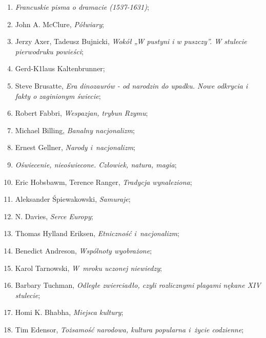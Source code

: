 \documentclass[a4paper,11pt]{article}
\begin{document}
\begin{enumerate}
\item \textit{Francuskie pisma o dramacie (1537-1631)};

\item John A. McClure, \textit{Półwiary};

\item Jerzy Axer, Tadeusz Bujnicki, \textit{Wokół „W pustyni i w
    puszczy”. W stulecie pierwodruku powieści};

\item Gerd-K1laus Kaltenbrunner;

\item Steve Brusatte, \textit{Era dinozaurów - od narodzin do upadku.
    Nowe odkrycia i fakty o zaginionym świecie};

\item Robert Fabbri, \textit{Wespazjan, trybun Rzymu};

\item Michael Billing, \textit{Banalny nacjonalizm};

\item Ernest Gellner, \textit{Narody i~nacjonalizm};

\item \textit{Oświecenie, nieoświecone. Człowiek, natura, magia};

\item Eric Hobsbawm, Terence Ranger, \textit{Tradycja wynaleziona};

\item Aleksander Śpiewakowski, \textit{Samuraje};

\item N. Davies, \textit{Serce Europy};

\item Thomas Hylland Eriksen, \textit{Etniczność i~nacjonalizm};

\item Benedict Andreson, \textit{Wspólnoty wyobrażone};

\item Karol Tarnowski, \textit{W~mroku uczonej niewiedzy};

\item Barbary Tuchman, \textit{Odległe zwierciadło, czyli rozlicznymi
    plagami nękane XIV stulecie};

\item Homi K. Bhabha, \textit{Miejsca kultury};

\item Tim Edensor, \textit{Tożsamość narodowa, kultura popularna i~życie
    codzienne};


\end{enumerate}
\end{document}
